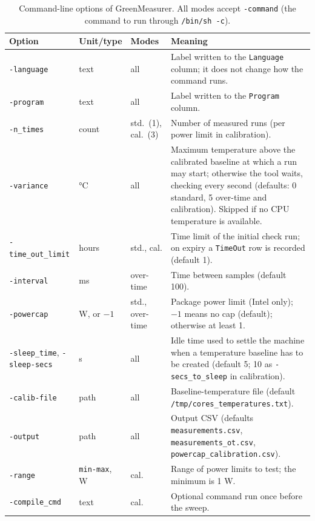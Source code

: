 \begin{table}[t]
    \centering
    \caption{Command-line options of GreenMeasurer. All modes accept \texttt{-command} (the command to run through \texttt{/bin/sh -c}).}
    \label{table:arguments}
    \small
    \begin{tabularx}{\textwidth}{@{}l l l X@{}}
        \toprule
        \textbf{Option} & \textbf{Unit/type} & \textbf{Modes} & \textbf{Meaning} \\
        \midrule
        \texttt{-language} & text & all & Label written to the \texttt{Language} column; it does not change how the command runs. \\
        \texttt{-program} & text & all & Label written to the \texttt{Program} column. \\
        \texttt{-n\_times} & count & std.\ (1), cal.\ (3) & Number of measured runs (per power limit in calibration). \\
        \texttt{-variance} & \si{\celsius} & all & Maximum temperature above the calibrated baseline at which a run may start; otherwise the tool waits, checking every second (defaults: 0 standard, 5 over-time and calibration). Skipped if no CPU temperature is available. \\
        \texttt{-time\_out\_limit} & hours & std., cal. & Time limit of the initial check run; on expiry a \texttt{TimeOut} row is recorded (default 1). \\
        \texttt{-interval} & ms & over-time & Time between samples (default 100). \\
        \texttt{-powercap} & W, or $-1$ & std., over-time & Package power limit (Intel only); $-1$ means no cap (default); otherwise at least 1. \\
        \texttt{-sleep\_time}, \texttt{-sleep-secs} & s & all & Idle time used to settle the machine when a temperature baseline has to be created (default 5; 10 as \texttt{-secs\_to\_sleep} in calibration). \\
        \texttt{-calib-file} & path & all & Baseline-temperature file (default \texttt{/tmp/cores\_temperatures.txt}). \\
        \texttt{-output} & path & all & Output CSV (defaults \texttt{measurements.csv}, \texttt{measurements\_ot.csv}, \texttt{powercap\_calibration.csv}). \\
        \texttt{-range} & \texttt{min-max}, W & cal. & Range of power limits to test; the minimum is 1 W. \\
        \texttt{-compile\_cmd} & text & cal. & Optional command run once before the sweep. \\
        \bottomrule
    \end{tabularx}
\end{table}

